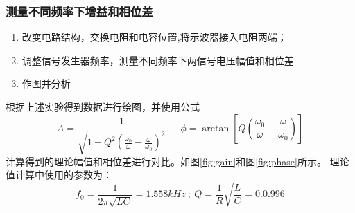 \documentclass[UTF8]{ctexart}
\begin{document}
\subsubsection{测量不同频率下增益和相位差}
\begin{enumerate}
    \item 改变电路结构，交换电阻和电容位置,将示波器接入电阻两端；
    \item 调整信号发生器频率，测量不同频率下两信号电压幅值和相位差
    \item 作图并分析
\end{enumerate}
根据上述实验得到数据进行绘图，并使用公式
\begin{equation}
    A = \frac{1}{\sqrt{1 + Q^2(\frac{\omega_0}{\omega} - \frac{\omega}{\omega_0})^2}}, \quad
    \phi = \arctan\left[Q\left(\frac{\omega_0}{\omega} - \frac{\omega}{\omega_0}\right)\right]
\end{equation}
计算得到的理论幅值和相位差进行对比。如图\ref{fig:gain}和图\ref{fig:phase}所示。
理论值计算中使用的参数为：
\begin{equation}
    f_0=\frac{1}{2\pi\sqrt{LC}}=1.558kHz\ ;\ Q = \frac{1}{R}\sqrt{\frac{L}{C}}=0.0.996
\end{equation}
\end{document}

